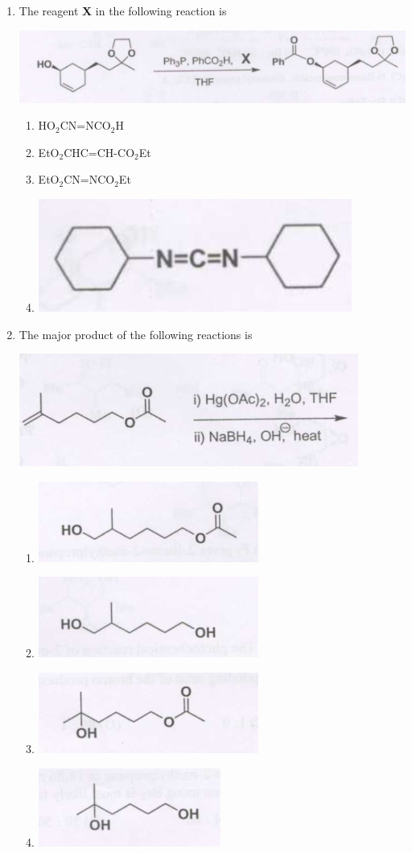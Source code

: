 \documentclass[12pt]{article}
\begin{document}
\begin{enumerate}
\item The reagent \textbf{X} in the following reaction is

\begin{center}
\includegraphics[width=0.6\columnwidth]{figs/q45.png}
\end{center}    \hfill{}
\begin{enumerate}
\item HO$_2$CN=NCO$_2$H
\item EtO$_2$CHC=CH-CO$_2$Et
\item EtO$_2$CN=NCO$_2$Et
\item \includegraphics[width=0.3\columnwidth]{figs/q45 d.png}
\end{enumerate}


\item The major product of the following reactions is

\begin{center}
\includegraphics[width=0.6\columnwidth]{figs/q46.png}
\end{center}    \hfill{}
\begin{enumerate}
    \item \includegraphics[width=0.3\columnwidth]{figs/q46 a.png}
    \item \includegraphics[width=0.3\columnwidth]{figs/q46 b.png}
    \item \includegraphics[width=0.3\columnwidth]{figs/q46 c.png}
    \item \includegraphics[width=0.3\columnwidth]{figs/q46 d.png}
\end{enumerate}



\end{enumerate}
\end{document}
